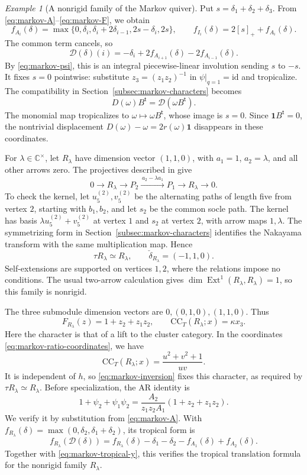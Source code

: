 \documentclass[11pt]{amsart}
\numberwithin{equation}{section}
\theoremstyle{definition}
\theoremstyle{remark}
\newtheorem{example}[theorem]{Example}
\newcommand{\op}[1]{\operatorname{#1}}
\newcommand{\CC}{\mathrm{CC}}
\newcommand{\Ext}{\op{Ext}}
\begin{document}
\begin{example}[A nonrigid family of the Markov quiver]
Put $s=\delta_1+\delta_2+\delta_3$. From
\eqref{eq:markov-A}--\eqref{eq:markov-F}, we obtain
\[ f_{A_i}(\delta)=\max\{0,\delta_i,\delta_i+2\delta_{i-1},2s-\delta_i,2s\},\qquad f_{I_i}(\delta)=2[s]_++f_{A_i}(\delta). \]
The common term cancels, so
\begin{equation}\label{eq:markov-tropical-y} \mathcal D(\delta)(i)=-\delta_i+2f_{A_{i+1}}(\delta)-2f_{A_{i-1}}(\delta).\end{equation}
By \eqref{eq:markov-psi}, this is an integral piecewise-linear involution
sending $s$ to $-s$. It fixes $s=0$ pointwise: substitute
$z_3=(z_1z_2)^{-1}$ in $\psi|_{q=1}=\mathrm{id}$ and tropicalize.
The compatibility in Section~\ref{subsec:markov-characters} becomes
\[ D(\omega)B^{\mathsf t}=\mathcal D(\omega B^{\mathsf t}). \]
The monomial map tropicalizes to $\omega\mapsto\omega B^{\mathsf t}$,
whose image is $s=0$. Since $\mathbf1 B^{\mathsf t}=0$, the
nontrivial displacement $D(\omega)-\omega=2r(\omega)\mathbf1$
disappears in these coordinates.

For $\lambda\in\mathbb C^\times$, let $R_\lambda$ have dimension
vector $(1,1,0)$, with $a_1=1$, $a_2=\lambda$, and all other
arrows zero. The projectives described in \cite[Example~4.3]{Pla13} give
\[ 0\longrightarrow R_\lambda\longrightarrow P_2\xrightarrow{\,a_2-\lambda a_1\,}P_1\longrightarrow R_\lambda\longrightarrow0. \]
To check the kernel, let $u_5^{(2)},v_5^{(2)}$ be the alternating
paths of length five from vertex $2$, starting with $b_1,b_2$,
and let $s_2$ be the common socle path. The kernel has basis
$\lambda u_5^{(2)}+v_5^{(2)}$ at vertex $1$ and $s_2$ at
vertex $2$, with arrow maps $1,\lambda$. The symmetrizing form
in Section~\ref{subsec:markov-characters} identifies the Nakayama
transform with the same multiplication map. Hence
\[ \tau R_\lambda\simeq R_\lambda,\qquad \check\delta_{R_\lambda}=(-1,1,0). \]
Self-extensions are supported on vertices $1,2$, where the relations
impose no conditions. The usual two-arrow calculation gives
$\dim\Ext^1(R_\lambda,R_\lambda)=1$, so this family is nonrigid.

The three submodule dimension vectors are $0,(0,1,0),(1,1,0)$. Thus
\[ F_{R_\lambda}(z)=1+z_2+z_1z_2,\qquad \CC_T(R_\lambda;x)=\kappa x_3. \]
Here the character is that of a lift to the cluster category. In the
coordinates \eqref{eq:markov-ratio-coordinates}, we have
\[ \CC_T(R_\lambda;x)=\frac{u^2+v^2+1}{uv}. \]
It is independent of $h$, so \eqref{eq:markov-inversion} fixes this
character, as required by $\tau R_\lambda\simeq R_\lambda$.
Before specialization, the AR identity is
\[ 1+\psi_2+\psi_1\psi_2=\frac{A_2}{z_1z_2A_1}(1+z_2+z_1z_2). \]
We verify it by substitution from \eqref{eq:markov-A}. With
$f_{R_\lambda}(\delta)=\max(0,\delta_2,\delta_1+\delta_2)$,
its tropical form is
\[ f_{R_\lambda}(\mathcal D(\delta))=f_{R_\lambda}(\delta)-\delta_1-\delta_2-f_{A_1}(\delta)+f_{A_2}(\delta). \]
Together with \eqref{eq:markov-tropical-y}, this verifies the tropical
translation formula for the nonrigid family $R_\lambda$.
\end{example}
\end{document}
